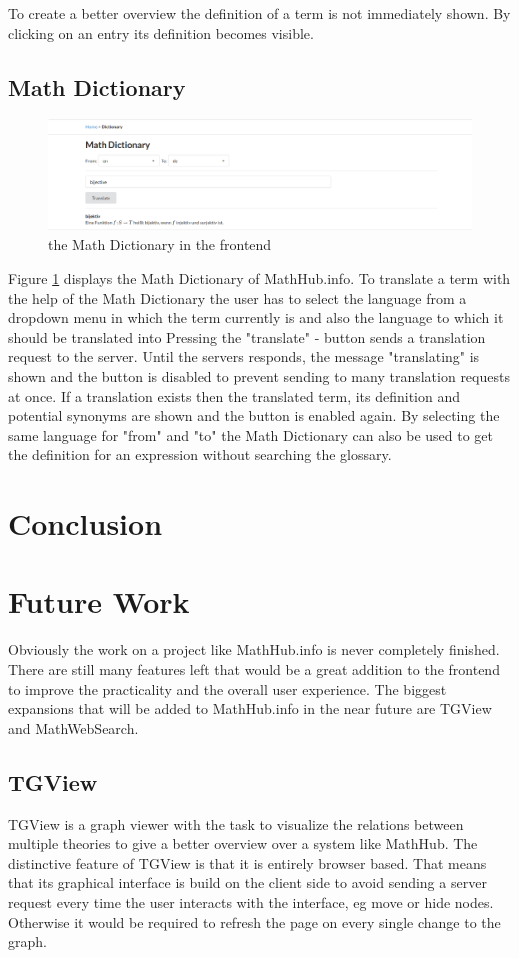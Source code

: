 \documentclass[11pt,a4paper]{article}
\begin{document}
To create a better overview the definition of a term is not immediately shown.
By clicking on an entry its definition becomes visible.

\subsection{Math Dictionary}
\begin{figure}[H]
\includegraphics[width=1\textwidth]{dictionary.png}
\caption{the Math Dictionary in the frontend}
\label{fig:dict}
\end{figure}
Figure \ref{fig:dict} displays the Math Dictionary of MathHub.info.
To translate a term with the help of the Math Dictionary the user has to select the language from a dropdown menu in which the term currently is and also the language to which it should be translated into
Pressing the "translate" - button sends a translation request to the server.
Until the servers responds, the message "translating" is shown and the button is disabled to prevent sending to many translation requests at once.
If a translation exists then the translated term, its definition and potential synonyms are shown and the button is enabled again.
By selecting the same language for "from" and "to" the Math Dictionary can also be used to get the definition for an expression without searching the glossary.

\section{Conclusion}
\section{Future Work}
Obviously the work on a project like MathHub.info is never completely finished.
There are still many features left that would be a great addition to the frontend to improve the practicality and the overall user experience. 
The biggest expansions that will be added to MathHub.info in the near future are TGView and MathWebSearch.

	\subsection{TGView} 
	TGView is a graph viewer with the task to visualize the relations between multiple theories to give a better overview over a system like MathHub.
	 The distinctive feature of TGView is that it is entirely browser based. 
	 That means that its graphical interface is build on the client side to avoid sending a server request every time the user interacts with the interface, eg move or hide nodes.
	 Otherwise it would be required to refresh the page on every single change to the graph. 	\cite{tgview}
	 
\end{document}

